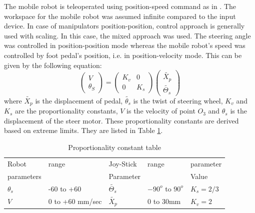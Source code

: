 The mobile robot is teleoperated using position-speed command as in \cite{farkhatdinov2007hybrid}.  The workspace for the mobile robot was assumed  infinite compared to the input device. In case of manipulators position-position, control approach is generally used with scaling. In this case,  the mixed approach was used. The steering angle was controlled in position-position mode whereas the mobile robot's speed was controlled by foot pedal's position, i.e. in  position-velocity mode. This can be given by the following equation: 
\begin{equation}
	\begin{pmatrix}
	V\\\theta_S
	\end{pmatrix}=
	\begin{pmatrix}
	K_v & 0\\0 & K_s
	\end{pmatrix}
	\begin{pmatrix}
	\tilde{X_p}\\
	\tilde{\Theta_s}
	\end{pmatrix}
\end{equation}
where $\tilde{X_p}$ is the displacement of pedal, $\tilde{\theta_s}$ is the twist of steering wheel, $K_v$ and $K_s$ are the proportionality constants, $V$ is the velocity of point $O_3$   and $\theta_s$ is the displacement of the steer motor. These proportionality constants are derived  based on extreme limits. They are  listed in Table \ref{tbl:propCnst}. 

\begin{table}[!htbp]
	\caption{Proportionality constant table} 
	\label{tbl:propCnst}
	\centering
	\begin{tabular}{l l l l l}
		\hline
		Robot  & range & Joy-Stick& range & parameter \\
		parameters& & Parameter & & Value\\
		\hline
		$\theta_s$ & -60 to +60 & $\tilde{\Theta_s}$ & $-90^o$ to $90^o$ & $K_s=2/3$\\
		$V$ & 0 to +60 mm/sec & $\tilde{X_p}$ & 0 to 30mm & $K_v=2$\\
		\hline
	\end{tabular}	
\end{table}


